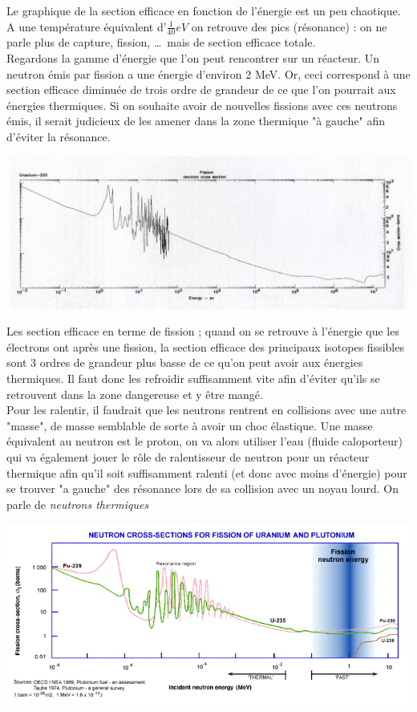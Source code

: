 Le graphique de la section efficace en fonction de l'énergie est un peu chaotique. A une température 
équivalent d'$\frac{1}{40}eV$ on retrouve des pics (résonance) : on ne parle plus de capture, 
fission, \dots \ mais de section efficace totale.\\

Regardons la gamme d'énergie que l'on peut rencontrer sur un réacteur. Un neutron émis par 
fission a une énergie d'environ 2 MeV. Or, ceci correspond à une section efficace diminuée de 
trois ordre de grandeur de ce que l'on pourrait aux énergies thermiques. Si on souhaite avoir 
de nouvelles fissions avec ces neutrons émis, il serait judicieux de les amener dans la zone 
thermique "à gauche" afin d'éviter la résonance.

\begin{center}
	\includegraphics[scale=0.23]{ch1/image4.png}
\end{center}

Les section efficace en terme de fission ; quand on se retrouve à l'énergie que les électrons ont après une fission, la section efficace des principaux isotopes fissibles sont 3 ordres de grandeur plus basse de ce qu'on peut avoir aux énergies thermiques. Il faut donc les refroidir suffisamment 
vite afin d'éviter qu'ils se retrouvent dans la zone dangereuse et y être mangé.\\


Pour les ralentir, il faudrait que les neutrons rentrent en collisions avec une autre "masse", de masse semblable de sorte à avoir un choc élastique. Une masse équivalent au neutron est le proton, 
on va alors utiliser l'eau (fluide caloporteur) qui va également jouer le rôle de ralentisseur de 
neutron pour un réacteur thermique afin qu'il soit suffisamment ralenti (et donc avec moins 
d'énergie) pour se trouver "a gauche" des résonance lors de sa collision avec un noyau lourd. On 
parle de \textit{neutrons thermiques}



\begin{center}
	\includegraphics[scale=0.7]{ch1/image5.png}
\end{center}

